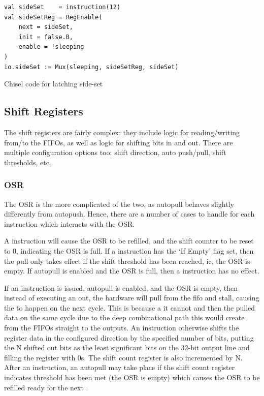\begin{listing}[h!]
    \vspace{0.5cm}
    \begin{verbatim}
val sideSet    = instruction(12)
val sideSetReg = RegEnable(
    next = sideSet, 
    init = false.B, 
    enable = !sleeping
)
io.sideSet := Mux(sleeping, sideSetReg, sideSet)
    \end{verbatim}
    \caption{Chisel code for latching side-set}
    \label{lst:side-set}
\end{listing}



\subsection{Shift Registers}

The shift registers are fairly complex: they include logic for reading/writing from/to the FIFOs, as well as logic for shifting bits in and out. There are multiple configuration options too: shift direction, auto push/pull, shift thresholds, etc.


\subsubsection{OSR}

The OSR is the more complicated of the two, as autopull behaves slightly differently from autopush. Hence, there are a number of cases to handle for each instruction which interacts with the OSR.

A  instruction will cause the OSR to be refilled, and the shift counter to be reset to 0, indicating the OSR is full. If a  instruction has the `If Empty' flag set, then the pull only takes effect if the shift threshold has been reached, ie, the OSR is empty. If autopull is enabled and the OSR is full, then a  instruction has no effect.

If an  instruction is issued, autopull is enabled, and the OSR is empty, then instead of executing an out, the hardware will pull from the fifo and stall, causing the  to happen on the next cycle. This is because a it cannot  and then  the pulled data on the same cycle due to the deep combinational path this would create from the FIFOs straight to the outputs. An  instruction otherwise shifts the register data in the configured direction by the specified number of bits, putting the N shifted out bits as the least significant bits on the 32-bit output line and filling the register with 0s. The shift count register is also incremented by N. After an  instruction, an autopull may take place if the shift count register indicates threshold has been met (the OSR is empty) which causes the OSR to be refilled ready for the next .

